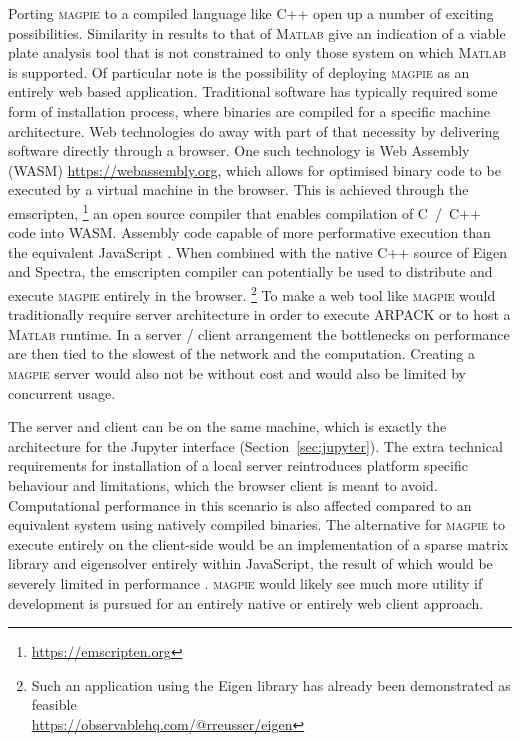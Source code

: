 Porting \textsc{magpie} to a compiled language like \textsc{C++} open up a
number of exciting possibilities. Similarity in results to that of
M\textsc{atlab} give an indication of a viable plate analysis tool that is not
constrained to only those system on which M\textsc{atlab} is supported. Of
particular  note is the possibility of deploying \textsc{magpie} as an entirely
web based application. Traditional software has typically required some form of
installation process, where binaries are compiled for a specific machine
architecture. Web technologies do away with part of that necessity by delivering
software directly through a browser. One such technology is Web Assembly (WASM)
\url{https://webassembly.org}, which allows for optimised binary code to be
executed by a virtual machine in the browser. This is achieved through the
emscripten,%
\footnote{\url{https://emscripten.org}} an open source compiler that enables
compilation of \textsc{C}~/~\textsc{C++} code into WASM. Assembly code capable
of more performative execution than the equivalent JavaScript
\cite{reiser_accelerate_2017}. When combined with the native \textsc{C++} source
of Eigen and Spectra, the emscripten compiler can potentially be used to
distribute and execute \textsc{magpie} entirely in the browser.%
\footnote{Such an application using the Eigen library has already been
    demonstrated as feasible\\ \url{https://observablehq.com/@rreusser/eigen}} To
make a web tool like \textsc{magpie} would traditionally require server
architecture in order to execute ARPACK or to host a M\textsc{atlab} runtime. In
a server / client arrangement the bottlenecks on performance are then tied to
the slowest of the network and the computation. Creating a \textsc{magpie}
server would also not be without cost and would also be limited by concurrent
usage.

The server and client can be on the same machine, which is exactly the
architecture for the Jupyter interface (Section~\ref{sec:jupyter}). The extra
technical requirements for installation of a local server reintroduces platform
specific behaviour and limitations, which the browser client is meant to avoid.
Computational performance in this scenario is also affected compared to an
equivalent system using natively compiled binaries. The alternative for
\textsc{magpie} to execute entirely on the client-side would be an
implementation of a sparse matrix library and eigensolver entirely within
JavaScript, the result of which would be severely limited in performance
\cite{lion_investigating_2022}. \textsc{magpie} would likely see much more
utility if development is pursued for an entirely native or entirely web client
approach.

